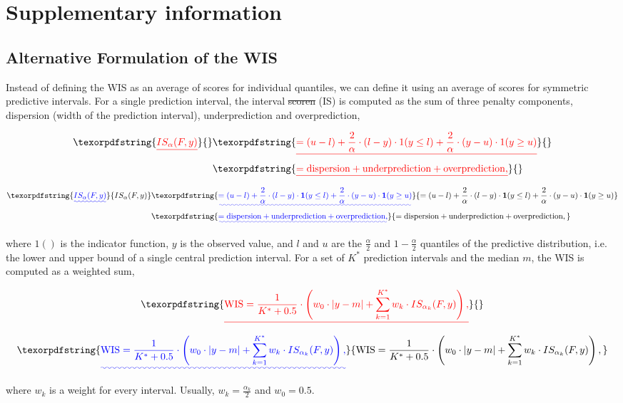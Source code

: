 \documentclass{article}
\providecommand{\DIFaddtex}[1]{{\protect\color{blue}\uwave{#1}}} %
\providecommand{\DIFdeltex}[1]{{\protect\color{red}\sout{#1}}}                      %
\providecommand{\DIFaddbegin}{} %
\providecommand{\DIFaddend}{} %
\providecommand{\DIFdelbegin}{} %
\providecommand{\DIFdelend}{} %
\providecommand{\DIFadd}[1]{\texorpdfstring{\DIFaddtex{#1}}{#1}} %
\providecommand{\DIFdel}[1]{\texorpdfstring{\DIFdeltex{#1}}{}} %
\newcommand{\DIFscaledelfig}{0.5}
\newlength{\DIFdelgraphicswidth} %
\newlength{\DIFdelgraphicsheight} %
\newcommand{\DIFaddincludegraphics}[2][]{{\color{blue}\fbox{\DIFOincludegraphics[#1]{#2}}}} %
\newcommand{\DIFdelincludegraphics}[2][]{%
\sbox{\DIFdelgraphicsbox}{\DIFOincludegraphics[#1]{#2}}%
\settoboxwidth{\DIFdelgraphicswidth}{\DIFdelgraphicsbox} %
\settoboxtotalheight{\DIFdelgraphicsheight}{\DIFdelgraphicsbox} %
\scalebox{\DIFscaledelfig}{%
\parbox[b]{\DIFdelgraphicswidth}{\usebox{\DIFdelgraphicsbox}\\[-\baselineskip] \rule{\DIFdelgraphicswidth}{0em}}\llap{\resizebox{\DIFdelgraphicswidth}{\DIFdelgraphicsheight}{%
\setlength{\unitlength}{\DIFdelgraphicswidth}%
\begin{picture}(1,1)%
\thicklines\linethickness{2pt} %
{\color[rgb]{1,0,0}\put(0,0){\framebox(1,1){}}}%
{\color[rgb]{1,0,0}\put(0,0){\line( 1,1){1}}}%
{\color[rgb]{1,0,0}\put(0,1){\line(1,-1){1}}}%
\end{picture}%
}\hspace*{3pt}}} %
} %
\DeclareRobustCommand{\DIFaddbegin}{\DIFOaddbegin \let\includegraphics\DIFaddincludegraphics} %
\DeclareRobustCommand{\DIFaddend}{\DIFOaddend \let\includegraphics\DIFOincludegraphics} %
\DeclareRobustCommand{\DIFdelbegin}{\DIFOdelbegin \let\includegraphics\DIFdelincludegraphics} %
\DeclareRobustCommand{\DIFdelend}{\DIFOaddend \let\includegraphics\DIFOincludegraphics} %
\begin{document}
\newpage

\appendix
\section{Supplementary information}

\renewcommand{\thefigure}{SI.\arabic{figure}}
\setcounter{figure}{0}
\renewcommand{\thetable}{SI.\arabic{table}} \setcounter{table}{0}

\subsection{Alternative Formulation of the WIS}
\label{sec:alternative-wis}

Instead of defining the WIS as an average of scores for individual quantiles, we can define it using an average of scores for symmetric predictive intervals. For a single prediction interval, the interval \DIFdelbegin \DIFdel{scoren }\DIFdelend \DIFaddbegin \DIFadd{score }\DIFaddend (IS) is computed as the sum of three penalty components, dispersion (width of the prediction interval), underprediction and overprediction,  
%
\begin{linenomath*}
\DIFdelbegin \begin{align*}
 \DIFdel{IS_\alpha(F,y) }&\DIFdel{= (u-l) + \frac{2}{\alpha} \cdot (l-y) \cdot 1(y \leq l) + \frac{2}{\alpha} \cdot (y-u) \cdot 1(y \geq u) }\\
 &\DIFdel{= \text{dispersion} + \text{underprediction} + \text{overprediction},    
}\end{align*}%
\DIFdelend \DIFaddbegin \begin{align}
 \DIFadd{IS_\alpha(F,y) }&\DIFadd{= (u-l) + \frac{2}{\alpha} \cdot (l-y) \cdot \boldsymbol{1}(y \leq l) + \frac{2}{\alpha} \cdot (y-u) \cdot \boldsymbol{1}(y \geq u) }\\
 &\DIFadd{= \text{dispersion} + \text{underprediction} + \text{overprediction},    
}\end{align}\DIFaddend 
\end{linenomath*}
%
where \DIFdelbegin \DIFdel{$1()$ }\DIFdelend \DIFaddbegin \DIFadd{$\boldsymbol{1}()$ }\DIFaddend is the indicator function, $y$ is the observed value, and $l$ and $u$ are the $\frac{\alpha}{2}$ and $1 - \frac{\alpha}{2}$ quantiles of the predictive distribution, i.e. the lower and upper bound of a single central prediction interval. For a set of $K^*$ prediction intervals and the median $m$, the WIS is computed as a weighted sum, 
\begin{linenomath*}
\DIFdelbegin \begin{displaymath}
\DIFdel{\text{WIS} = \frac{1}{K^* + 0.5} \cdot \left(w_0 \cdot |y - m| + \sum_{k = 1}^{K^*} w_k \cdot IS_{\alpha_{k}}(F, y)\right),    
}\end{displaymath}%
\DIFdelend \DIFaddbegin \begin{equation}
\DIFadd{\text{WIS} = \frac{1}{K^* + 0.5} \cdot \left(w_0 \cdot |y - m| + \sum_{k = 1}^{K^*} w_k \cdot IS_{\alpha_{k}}(F, y)\right),    
}\end{equation}\DIFaddend  
\end{linenomath*}
where $w_k$ is a weight for every interval. Usually, $w_k = \frac{\alpha_k}{2}$ and $w_0 = 0.5$. 
\end{document}

